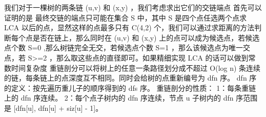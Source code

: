 {}
\markdownRendererSectionEnd \markdownRendererSectionBegin
{}\markdownRendererInterblockSeparator
{}我们对于一棵树的两条链\markdownRendererDollarSign{} (u,v) \markdownRendererDollarSign{}和\markdownRendererDollarSign{} (x,y) \markdownRendererDollarSign{}，我们考虑求出它们的交链端点\markdownRendererParagraphSeparator
{}首先可以证明的是 最终交链的端点只可能在集合\markdownRendererDollarSign{} S \markdownRendererDollarSign{}中，其中\markdownRendererDollarSign{} S \markdownRendererDollarSign{}是四个点任选两个点求\markdownRendererDollarSign{} LCA \markdownRendererDollarSign{}以后的点，显然这样的点最多只有\markdownRendererDollarSign{} C(4,2) \markdownRendererDollarSign{}个，我们可以通过求距离的方法判断每个点是否在链上，那么同时在\markdownRendererDollarSign{} (u,v) \markdownRendererDollarSign{}和\markdownRendererDollarSign{} (x,y) \markdownRendererDollarSign{}上的点可以成为候选点，若候选点个数\markdownRendererDollarSign{} \markdownRendererPipe{}S\markdownRendererPipe{}=0 \markdownRendererDollarSign{},那么树链完全无交，若候选点个数\markdownRendererDollarSign{} \markdownRendererPipe{}S\markdownRendererPipe{}=1 \markdownRendererDollarSign{}，那么该候选点为唯一交点，若\markdownRendererDollarSign{} \markdownRendererPipe{}S\markdownRendererPipe{}>=2 \markdownRendererDollarSign{}，那么取这些点的直径即可。如果精细实现\markdownRendererDollarSign{} LCA \markdownRendererDollarSign{}的话可以做到常数时间复杂度\markdownRendererInterblockSeparator
{}\markdownRendererInterblockSeparator
{}
\markdownRendererSectionEnd \markdownRendererSectionBegin
{}\markdownRendererInterblockSeparator
{}重链剖分可以将树上的任意一条路径划分成不超过 \markdownRendererDollarSign{}O(\markdownRendererBackslash{}log n)\markdownRendererDollarSign{} 条连续的链，每条链上的点深度互不相同。同时会给树的点重新编号为 \markdownRendererDollarSign{}dfn\markdownRendererDollarSign{} 序。\markdownRendererParagraphSeparator
{}\markdownRendererDollarSign{}dfn\markdownRendererDollarSign{} 序的定义：按先遍历重儿子的顺序得到的 \markdownRendererDollarSign{}dfs\markdownRendererDollarSign{} 序。\markdownRendererParagraphSeparator
{}重链剖分的性质：\markdownRendererParagraphSeparator
{}1：每条重链上的 \markdownRendererDollarSign{}dfn\markdownRendererDollarSign{} 序连续。\markdownRendererHardLineBreak
{}2：每个点子树内的 \markdownRendererDollarSign{}dfn\markdownRendererDollarSign{} 序连续，节点 \markdownRendererDollarSign{}u\markdownRendererDollarSign{} 子树内的 \markdownRendererDollarSign{}dfn\markdownRendererDollarSign{} 序范围是 \markdownRendererDollarSign{}[dfn[u], dfn[u] + siz[u] - 1]\markdownRendererDollarSign{}。\markdownRendererHardLineBreak
